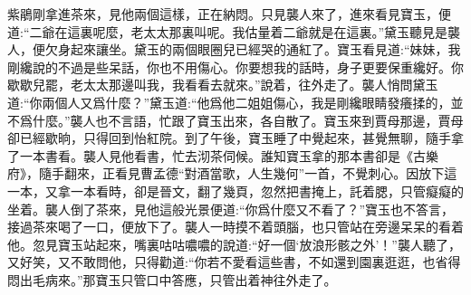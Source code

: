 \begin{parag}
    紫鵑剛拿進茶來，見他兩個這樣，正在納悶。只見襲人來了，進來看見寶玉，便道:“二爺在這裏呢麼，老太太那裏叫呢。我估量着二爺就是在這裏。”黛玉聽見是襲人，便欠身起來讓坐。黛玉的兩個眼圈兒已經哭的通紅了。寶玉看見道:“妹妹，我剛纔說的不過是些呆話，你也不用傷心。你要想我的話時，身子更要保重纔好。你歇歇兒罷，老太太那邊叫我，我看看去就來。”說着，往外走了。襲人悄問黛玉道:“你兩個人又爲什麼？”黛玉道:“他爲他二姐姐傷心，我是剛纔眼睛發癢揉的，並不爲什麼。”襲人也不言語，忙跟了寶玉出來，各自散了。寶玉來到賈母那邊，賈母卻已經歇晌，只得回到怡紅院。到了午後，寶玉睡了中覺起來，甚覺無聊，隨手拿了一本書看。襲人見他看書，忙去沏茶伺候。誰知寶玉拿的那本書卻是《古樂府》，隨手翻來，正看見曹孟德“對酒當歌，人生幾何”一首，不覺刺心。因放下這一本，又拿一本看時，卻是晉文，翻了幾頁，忽然把書掩上，託着腮，只管癡癡的坐着。襲人倒了茶來，見他這般光景便道:“你爲什麼又不看了？”寶玉也不答言，接過茶來喝了一口，便放下了。襲人一時摸不着頭腦，也只管站在旁邊呆呆的看着他。忽見寶玉站起來，嘴裏咕咕噥噥的說道:“好一個‘放浪形骸之外’！”襲人聽了，又好笑，又不敢問他，只得勸道:“你若不愛看這些書，不如還到園裏逛逛，也省得悶出毛病來。”那寶玉只管口中答應，只管出着神往外走了。
\end{parag}


